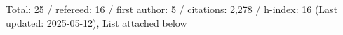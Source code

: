 Total: 25 / refereed: 16 / first author: 5 / citations: 2,278 / h-index: 16 (Last updated: 2025-05-12), List attached below